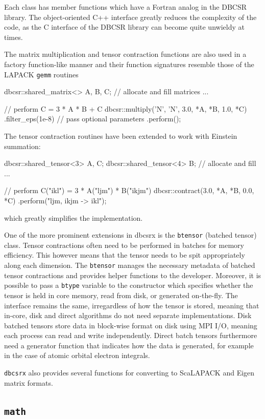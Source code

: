 Each class has member functions which have a Fortran analog in the DBCSR library. The object-oriented C++ interface greatly reduces the complexity of the code, as the C interface of the DBCSR library can become quite unwieldy at times.

The matrix multiplication and tensor contraction functions are also used in a factory function-like manner and their function signatures resemble those of the LAPACK \texttt{gemm} routines
\begin{cppinline}
dbcsr::shared_matrix<> A, B, C;
// allocate and fill matrices ...

// perform C = 3 * A * B + C 
dbcsr::multiply('N', 'N', 3.0, *A, *B, 1.0, *C)
	.filter_eps(1e-8) // pass optional parameters 
	.perform();
\end{cppinline}
\noindent The tensor contraction routines have been extended to work with Einstein summation:
\begin{cppinline}
dbcsr::shared_tensor<3> A, C;
dbcsr::shared_tensor<4> B;
// allocate and fill ...

// perform C("ikl") = 3 * A("ljm") * B("ikjm")
dbcsr::contract(3.0, *A, *B, 0.0, *C)
	.perform("ljm, ikjm -> ikl");
\end{cppinline}
\noindent which greatly simplifies the implementation.

One of the more prominent extensions in dbcsrx is the \texttt{btensor} (batched tensor) class. Tensor contractions often need to be performed in batches for memory efficiency. This however means that the tensor needs to be spit appropriately along each dimension. The \texttt{btensor} manages the necessary metadata of batched tensor contractions and provides helper functions to the developer. Moreover, it is possible to pass a \texttt{btype} variable to the constructor which specifies whether the tensor is held in core memory, read from disk, or generated on-the-fly. The interface remains the same, irregardless of how the tensor is stored, meaning that in-core, disk and direct algorithms do not need separate implementations. Disk batched tensors store data in block-wise format on disk using MPI I/O, meaning each process can read and write independently. Direct batch tensors furthermore need a generator function that indicates how the data is generated, for example in the case of atomic orbital electron integrals. 

\texttt{dbcsrx} also provides several functions for converting to ScaLAPACK and Eigen matrix formats. 

\subsection{\texttt{math}}

